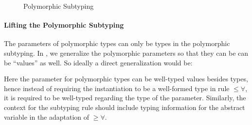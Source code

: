 \begin{figure}
\label{fig:polymorphic-subtyping}
\centering


\caption{Polymorphic Subtyping}
\end{figure}


\paragraph{Lifting the Polymorphic Subtyping}
\label{sec:polymorphic-subtyping}

The parameters of polymorphic types can only be types in the polymorphic
subtyping. In \name, we generalize the polymorphic parameters so that they can
be can be ``values'' as well. So ideally a direct generalization would be:


Here the parameter for polymorphic types can be well-typed values besides types,
hence instead of requiring the instantiation to be a well-formed type in rule
$\le\forall$, it is required to be well-typed regarding the type of the parameter.
Similarly, the context for the subtyping rule should include typing information
for the abstract variable in the adaptation of $\ge\forall$.

